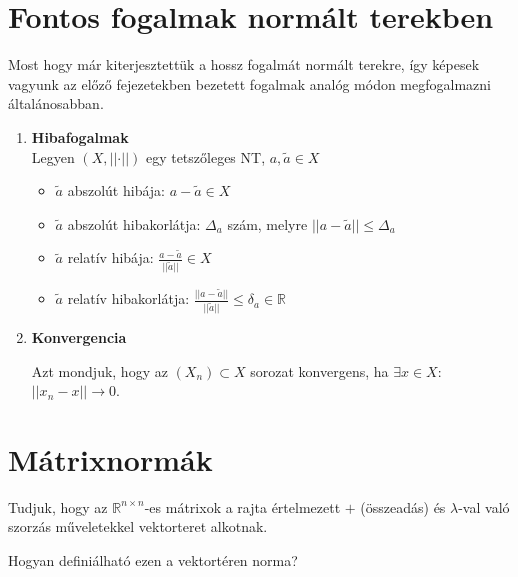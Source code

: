 \section{Fontos fogalmak normált terekben}
Most hogy már kiterjesztettük a hossz fogalmát normált terekre, így képesek vagyunk az előző fejezetekben bezetett fogalmak analóg módon megfogalmazni általánosabban.
\begin{enumerate}
    \item \textbf{Hibafogalmak} \\
    Legyen $(X, \lvert \lvert \cdot \rvert \rvert)$ egy tetszőleges NT, $a, \tilde{a} \in X$
    \begin{itemize}
        \item $\tilde{a}$ abszolút hibája: $a - \tilde{a} \in X$ 
        \item $\tilde{a}$ abszolút hibakorlátja: $\Delta_{a}$ szám, melyre $\lvert \lvert a- \tilde{a} \rvert \rvert \leq \Delta_{a}$ 
        \item $\tilde{a}$ relatív hibája: $\frac{a - \tilde{a}}{ \lvert \lvert \tilde{a} \rvert \rvert} \in X$
        \item $\tilde{a}$ relatív hibakorlátja: $\frac{\lvert \lvert a- \tilde{a} \rvert \rvert}{ \lvert \lvert \tilde{a} \rvert \rvert} \leq \delta_{a}\in\mathbb{R}$
    \end{itemize}

    
    \item \textbf{Konvergencia}
    \begin{definition}
        Azt mondjuk, hogy az $(X_{n}) \subset X$ sorozat konvergens, ha $\exists x \in X$: $\lvert \lvert x_{n}- x \rvert \rvert \to 0$.
    \end{definition}
\end{enumerate}

\section{Mátrixnormák}
Tudjuk, hogy az $\mathbb{R}^{n \times n}$-es mátrixok a rajta értelmezett $+$ (összeadás) és $\lambda$-val való szorzás műveletekkel vektorteret alkotnak.
\begin{kerdes}
    Hogyan definiálható ezen a vektortéren norma?
\end{kerdes}

